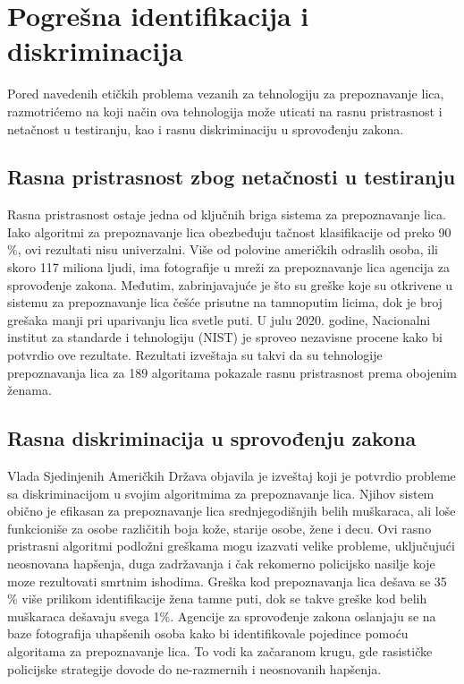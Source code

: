 \documentclass{article}
\begin{document}
\newpage

\section{Pogrešna identifikacija i diskriminacija}

Pored navedenih etičkih problema vezanih za tehnologiju za prepoznavanje lica, razmotrićemo na koji način ova tehnologija može uticati na rasnu pristrasnost i netačnost u testiranju, kao i rasnu diskriminaciju u sprovođenju zakona. 

\subsection{Rasna pristrasnost zbog netačnosti u testiranju}

Rasna pristrasnost ostaje jedna od ključnih briga sistema za prepoznavanje lica. Iako algoritmi za prepoznavanje lica obezbeđuju tačnost klasifikacije od preko 90 \%,  ovi rezultati nisu univerzalni.
\newline
\newline
Više od polovine američkih odraslih osoba, ili skoro 117 miliona ljudi, ima fotografije u mreži za prepoznavanje lica agencija za sprovođenje zakona. Međutim, zabrinjavajuće je što su greške koje su otkrivene u sistemu za prepoznavanje lica češće prisutne na tamnoputim licima, dok je broj grešaka manji pri uparivanju lica svetle puti. \cite{sedma}
\newline
\newline
U julu 2020. godine, Nacionalni institut za standarde i tehnologiju (NIST) je sproveo nezavisne procene kako bi potvrdio ove rezultate. Rezultati izveštaja su takvi da su tehnologije prepoznavanja lica za 189 algoritama pokazale rasnu pristrasnost prema obojenim ženama. 
\newline
\newline
\subsection{Rasna diskriminacija u sprovođenju zakona}

Vlada Sjedinjenih Američkih Država objavila je izveštaj koji je potvrdio probleme sa diskriminacijom u svojim algoritmima za prepoznavanje lica. Njihov sistem obično je efikasan za prepoznavanje lica srednjegodišnjih belih muškaraca, ali loše funkcioniše za osobe različitih boja kože, starije osobe, žene i decu. Ovi rasno pristrasni algoritmi podložni greškama mogu izazvati velike probleme, uključujući neosnovana hapšenja, duga zadržavanja i čak rekomerno policijsko nasilje koje moze rezultovati smrtnim ishodima. \cite{sesta}
\newline
\newline
Greška kod prepoznavanja lica dešava se 35 \% više prilikom identifikacije žena tamne puti, dok se takve greške kod belih muškaraca dešavaju svega 1\%.
\newline
\newline
Agencije za sprovođenje zakona oslanjaju se na baze fotografija uhapšenih osoba kako bi identifikovale pojedince pomoću algoritama za prepoznavanje lica. To vodi ka začaranom krugu, gde rasističke policijske strategije dovode do ne-razmernih i neosnovanih hapšenja.
\end{document}

